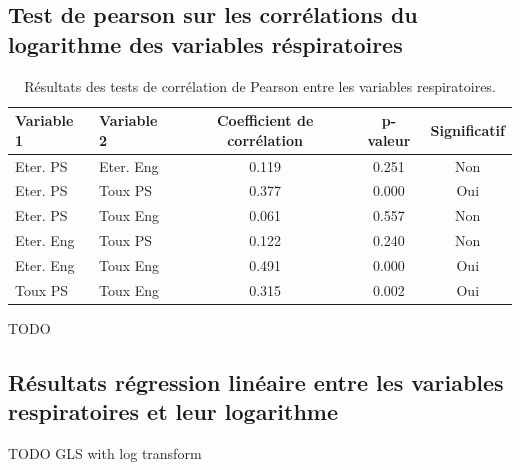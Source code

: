 \documentclass{article}
\begin{document}
\subsection{Test de pearson sur les corrélations du logarithme des variables réspiratoires}\label{annexe:pearson_log}
\begin{table}[ht]
    \centering
    \begin{tabular}{llccc}
    \toprule
    \textbf{Variable 1} & \textbf{Variable 2} & \textbf{Coefficient de corrélation} & \textbf{p-valeur} & \textbf{Significatif} \\
    \midrule
    Eter. PS & Eter. Eng & 0.119 & 0.251 & Non \\
    Eter. PS & Toux PS & 0.377 & 0.000 & Oui \\
    Eter. PS & Toux Eng & 0.061 & 0.557 & Non \\
    Eter. Eng & Toux PS & 0.122 & 0.240 & Non \\
    Eter. Eng & Toux Eng & 0.491 & 0.000 & Oui \\
    Toux PS & Toux Eng & 0.315 & 0.002 & Oui \\
    \bottomrule
    \end{tabular}
    \caption{Résultats des tests de corrélation de Pearson entre les variables respiratoires.}\label{tab:correlation_log_results}
\end{table}
TODO


\subsection{Résultats régression linéaire entre les variables respiratoires et leur logarithme}
TODO GLS with log transform 
\end{document}
